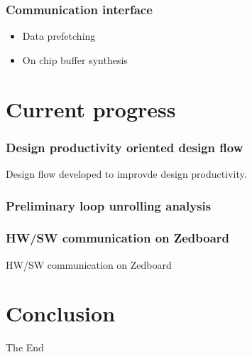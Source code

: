 \documentclass{beamer}
\begin{document}
\begin{frame}

\frametitle{Communication interface}
\begin{itemize}
\item Data prefetching
\item On chip buffer synthesis
\end{itemize}

\end{frame}



\section{Current progress}
\begin{frame}

\frametitle{Design productivity oriented design flow}
Design flow developed to improvde design productivity.

\end{frame}

\begin{frame}

\frametitle{Preliminary loop unrolling analysis}
\end{frame}

\begin{frame}

\frametitle{HW/SW communication on Zedboard}
HW/SW communication on Zedboard

\end{frame}

\section{Conclusion}
\begin{frame}
\Huge{\centerline{The End}}
\end{frame}

\end{document}
